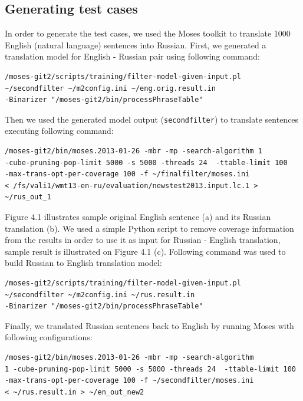 \subsection{Generating test cases}

In order to generate the test cases, we used the Moses toolkit to translate 1000 English (natural language) sentences into Russian. First, we generated a translation model for English - Russian pair using following command:

\begin{verbatim}
/moses-git2/scripts/training/filter-model-given-input.pl 
~/secondfilter ~/m2config.ini ~/eng.orig.result.in 
-Binarizer "/moses-git2/bin/processPhraseTable"
\end{verbatim} 

Then we used the generated model output (\texttt{secondfilter}) to translate sentences executing following command:

\begin{verbatim}
/moses-git2/bin/moses.2013-01-26 -mbr -mp -search-algorithm 1 
-cube-pruning-pop-limit 5000 -s 5000 -threads 24  -ttable-limit 100
-max-trans-opt-per-coverage 100 -f ~/finalfilter/moses.ini 
< /fs/vali1/wmt13-en-ru/evaluation/newstest2013.input.lc.1 > ~/rus_out_1
\end{verbatim} 

Figure 4.1 illustrates sample original English sentence (a) and its Russian translation (b). We used a simple Python script to remove coverage information from the results in order to use it as input for Russian - English translation, sample result is illustrated on Figure 4.1 (c). Following command was used to build Russian to English translation model:

\begin{verbatim}
/moses-git2/scripts/training/filter-model-given-input.pl 
~/secondfilter ~/m2config.ini ~/rus.result.in 
-Binarizer "/moses-git2/bin/processPhraseTable"
\end{verbatim} 

Finally, we translated Russian sentences back to English by running Moses with following configurations:

\begin{verbatim}
/moses-git2/bin/moses.2013-01-26 -mbr -mp -search-algorithm 
1 -cube-pruning-pop-limit 5000 -s 5000 -threads 24  -ttable-limit 100
-max-trans-opt-per-coverage 100 -f ~/secondfilter/moses.ini 
< ~/rus.result.in > ~/en_out_new2
\end{verbatim} 

